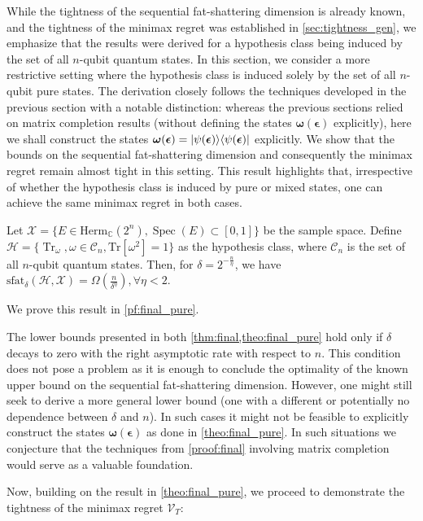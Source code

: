 

While the tightness of the sequential fat-shattering dimension is already known, and the tightness of the minimax regret was established in \cref{sec:tightness_gen}, we emphasize that the results were derived for a hypothesis class being induced by the set of all $n$-qubit quantum states. In this section, we consider a more restrictive setting where the hypothesis class is induced solely by the set of all $n$-qubit pure states. The derivation closely follows the techniques developed in the previous section with a notable distinction: whereas the previous sections relied on matrix completion results (without defining the states $\boldsymbol{\omega}(\boldsymbol{\epsilon})$ explicitly), here we shall construct the states $\boldsymbol{\omega}(\boldsymbol{\epsilon}) = | \psi(\boldsymbol{\epsilon}) \rangle \langle \psi(\boldsymbol{\epsilon}) |$ explicitly. We show that the bounds on the sequential fat-shattering dimension and consequently the minimax regret remain almost tight in this setting. This result highlights that, irrespective of whether the hypothesis class is induced by pure or mixed states, one can achieve the same minimax regret in both cases.


\begin{theorem} \label{theo:final_pure}
    Let $\mathcal{X} = \{E\in\mathrm{Herm}_{\mathbb{C}}(2^n), \operatorname{Spec}(E)\subset[0,1]\}$ be the sample space. Define $\mathcal{H}=\{\operatorname{Tr}_\omega, \omega\in\mathcal C_n, \mathrm{Tr}[\omega^2]=1\}$ as the hypothesis class, where $\mathcal{C}_n$ is the set of all $n$-qubit quantum states. Then, for $\delta=2^{-\frac n\eta}$, we have $\text{sfat}_\delta(\mathcal H, \mathcal{X})=\Omega(\frac n{\delta^\eta}), \forall\eta < 2$.
\end{theorem}

We prove this result in \cref{pf:final_pure}.

\begin{remark}
    The lower bounds presented in both \cref{thm:final,theo:final_pure} hold only if $\delta$ decays to zero with the right asymptotic rate with respect to $n$. This condition does not pose a problem as it is enough to conclude the optimality of the known upper bound on the sequential fat-shattering dimension. However, one might still seek to derive a more general lower bound (one with a different or potentially no dependence between $\delta$ and $n$). In such cases it might not be feasible to explicitly construct the states $\boldsymbol{\omega} (\boldsymbol{\epsilon})$ as done in \cref{theo:final_pure}. In such situations we conjecture that the techniques from \cref{proof:final} involving matrix completion would serve as a valuable foundation.
\end{remark}
Now, building on the result in \cref{theo:final_pure}, we proceed to demonstrate the tightness of the minimax regret $\mathcal{V}_T$:

